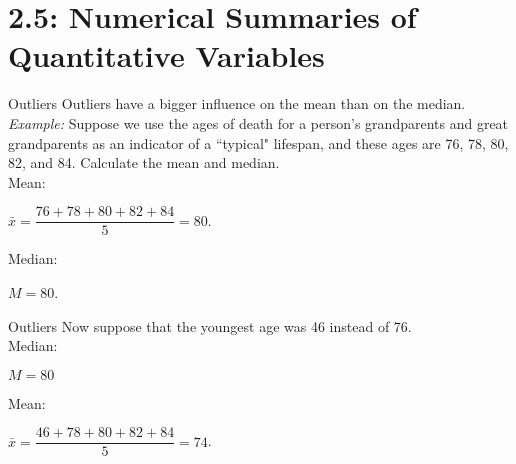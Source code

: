 \documentclass[Lecture.tex]{subfiles}
\begin{document}
\section{2.5: Numerical Summaries of Quantitative Variables}

\begin{frame}{Outliers}
Outliers have a bigger influence on the mean than on the median.\\ \pause
{\it Example:} Suppose we use the ages of death for a person's grandparents and great grandparents as an indicator of a ``typical" lifespan, and these ages are 76, 78, 80, 82, and 84.  Calculate the mean and median.\\ \pause
Mean:\\ \pause \begin{center}$\bar x=\dfrac{76+78+80+82+84}{5}=80.$\end{center}\pause
Median:\\ \pause \begin{center}$M=80$.\end{center}
\end{frame}
  
\begin{frame}{Outliers}
Now suppose that the youngest age was 46 instead of 76.\\ \pause
Median:\\  \begin{center}$M=80$\end{center}\pause
Mean:\\ \pause \begin{center}$\bar x=\dfrac{46+78+80+82+84}{5}=74$.\end{center}
\end{frame}
  
  
  
  
  
  
\end{document}
